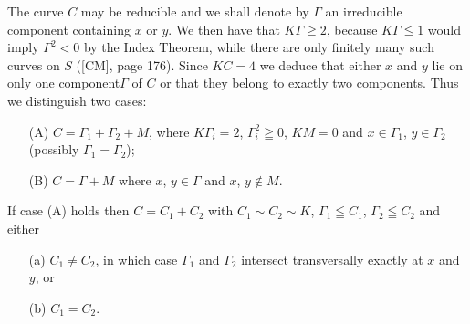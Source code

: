 The curve $C$ may be reducible and we shall denote by $\Gamma$ an
irreducible component containing $x$ or $y$. We then have that
$K\Gamma\geqq 2$, because $K\Gamma\leqq 1$ would imply $\Gamma^{2}<0$
by the Index Theorem, while there are only finitely many such curves
on $S$ ([CM], page 176). Since $KC=4$ we deduce that either
$x$ and $y$ lie on only one component\pageoriginale $\Gamma$ of $C$ or
that they belong to exactly two components. Thus we distinguish two
cases:
\begin{itemize}
\item[(A)] $C=\Gamma_{1}+\Gamma_{2}+M$, where $K\Gamma_{i}=2$, $\Gamma^{2}_{i}\geqq 0$, $KM=0$ and $x\in \Gamma_{1}$, $y\in\Gamma_{2}$ (possibly $\Gamma_{1}=\Gamma_{2}$); 

\item[(B)] $C=\Gamma+M$ where $x$, $y\in \Gamma$ and $x$, $y\not\in M$.
\end{itemize}

\begin{lem}\label{art04-lem2}
If case {\rm(A)} holds then $C=C_{1}+C_{2}$ with $C_{1}\sim C_{2}\sim K$, $\Gamma_{1}\leqq C_{1}$, $\Gamma_{2}\leqq C_{2}$ and either
\begin{itemize}
\item[\rm(a)] $C_{1}\neq C_{2}$, in which case $\Gamma_{1}$ and
$\Gamma_{2}$ intersect transversally exactly at $x$ and $y$, or

\item[\rm(b)] $C_{1}=C_{2}$. 
\end{itemize}
\end{lem}

